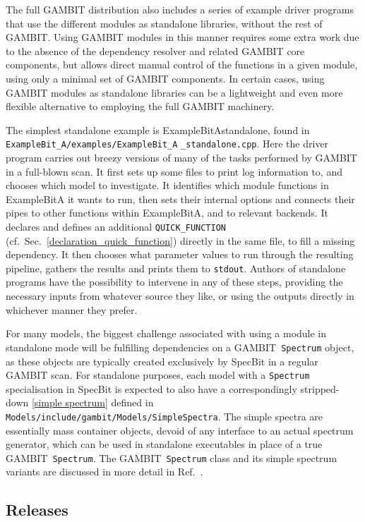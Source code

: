 \documentclass[pdftex,twocolumn,epjc3_preprint,runningheads]{svjour3}
\renewcommand{\_}{\discretionary{\underscore}{}{\underscore}}
\newcommand\cpp[1]{{\lstinline!#1!}}  %
\newcommand\term[1]{{\lstset{style=terminal}\lstinline!#1!\lstset{style=cpp}}}
\newcommand{\cross}[1]{\ref{#1}}
\newcommand{\gambit}{\textsf{GAMBIT}\xspace}
\newcommand{\specbit}{\textsf{SpecBit}\xspace}
\newcommand{\examplebita}{\textsf{ExampleBit\_A}\xspace}
\newcommand{\GB}{\gambit}
\begin{document}
The full \GB distribution also includes a series of example driver programs that use the different modules as standalone libraries, without the rest of \GB.  Using \GB modules in this manner requires some extra work due to the absence of the dependency resolver and related \GB core components, but allows direct manual control of the functions in a given module, using only a minimal set of \GB components.  In certain cases, using \GB modules as standalone libraries can be a lightweight and even more flexible alternative to employing the full \GB machinery.

The simplest standalone example is \textsf{ExampleBit\_A\_standalone}, found in \term{ExampleBit_A/}\term{examples/}\term{ExampleBit_A} \term{_standalone.cpp}.  Here the driver program carries out breezy versions of many of the tasks performed by \GB in a full-blown scan. It first sets up some files to print log information to, and chooses which model to investigate.  It identifies which module functions in \examplebita it wants to run, then sets their internal options and connects their pipes to other functions within \examplebita, and to relevant backends. It declares and defines an additional \cpp{QUICK_FUNCTION} (cf.\ Sec.\ \ref{declaration_quick_function}) directly in the same file, to fill a missing dependency.  It then chooses what parameter values to run through the resulting pipeline, gathers the results and prints them to \term{stdout}.  Authors of standalone programs have the possibility to intervene in any of these steps, providing the necessary inputs from whatever source they like, or using the outputs directly in whichever manner they prefer.

For many models, the biggest challenge associated with using a module in standalone mode will be fulfilling dependencies on a \GB\ \cpp{Spectrum} object, as these objects are typically created exclusively by \specbit in a regular \GB scan.  For standalone purposes, each model with a \cpp{Spectrum} specialisation in \specbit is expected to also have a correspondingly stripped-down \cross{simple spectrum} defined in \term{Models/include/gambit/Models/SimpleSpectra}.  The simple spectra are essentially mass container objects, devoid of any interface to an actual spectrum generator, which can be used in standalone executables in place of a true \GB\ \cpp{Spectrum}.  The \GB\ \cpp{Spectrum} class and its simple spectrum variants are discussed in more detail in Ref.\ \cite{SDPBit}.

\subsection{Releases}
\label{release}
\end{document}

